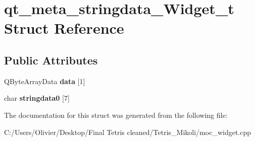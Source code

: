 \section{qt\+\_\+meta\+\_\+stringdata\+\_\+\+Widget\+\_\+t Struct Reference}
\label{structqt__meta__stringdata___widget__t}
\subsection*{Public Attributes}
\begin{DoxyCompactItemize}
\item 
\mbox{\label{structqt__meta__stringdata___widget__t_a9fe3de556b708897fb7eb999f1efbfcb}} 
Q\+Byte\+Array\+Data {\bfseries data} [1]
\item 
\mbox{\label{structqt__meta__stringdata___widget__t_abfd6a2b9daf76d6315586d12e8b7ec36}} 
char {\bfseries stringdata0} [7]
\end{DoxyCompactItemize}


The documentation for this struct was generated from the following file\+:\begin{DoxyCompactItemize}
\item 
C\+:/\+Users/\+Olivier/\+Desktop/\+Final Tetris cleaned/\+Tetris\+\_\+\+Mikoli/moc\+\_\+widget.\+cpp\end{DoxyCompactItemize}
